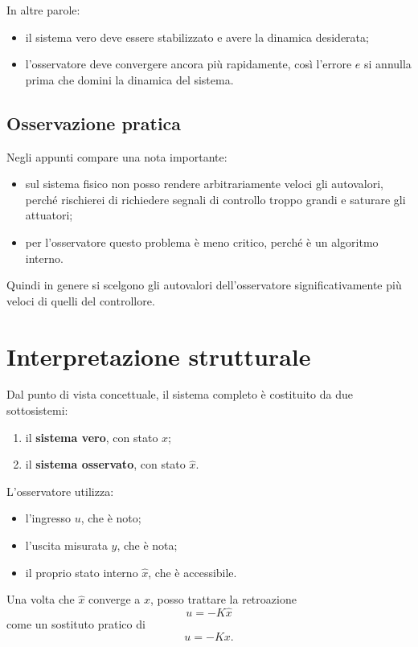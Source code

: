 In altre parole:
\begin{itemize}
    \item il sistema vero deve essere stabilizzato e avere la dinamica desiderata;
    \item l'osservatore deve convergere ancora più rapidamente,
    così l'errore \(e\) si annulla prima che domini la dinamica del sistema.
\end{itemize}

\subsection*{Osservazione pratica}

Negli appunti compare una nota importante:
\begin{itemize}
    \item sul sistema fisico non posso rendere arbitrariamente veloci gli autovalori, perché rischierei
    di richiedere segnali di controllo troppo grandi e saturare gli attuatori;
    \item per l'osservatore questo problema è meno critico, perché è un algoritmo interno.
\end{itemize}

Quindi in genere si scelgono gli autovalori dell'osservatore significativamente più veloci
di quelli del controllore.

\section{Interpretazione strutturale}

Dal punto di vista concettuale, il sistema completo è costituito da due sottosistemi:
\begin{enumerate}
    \item il \textbf{sistema vero}, con stato \(x\);
    \item il \textbf{sistema osservato}, con stato \(\hat x\).
\end{enumerate}

L'osservatore utilizza:
\begin{itemize}
    \item l'ingresso \(u\), che è noto;
    \item l'uscita misurata \(y\), che è nota;
    \item il proprio stato interno \(\hat x\), che è accessibile.
\end{itemize}

Una volta che \(\hat x\) converge a \(x\), posso trattare la retroazione
\[
u=-K\hat x
\]
come un sostituto pratico di
\[
u=-Kx.
\]

